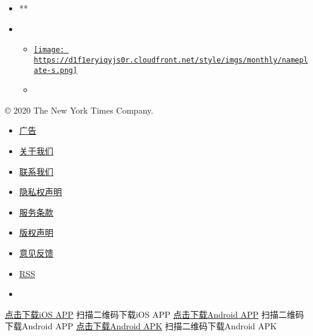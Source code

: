 \begin{itemize}
\item
  **
\item
  \begin{itemize}
  \item
    \href{https://www.shi-magazine.com/}{\texttt{[image: https://d1f1eryiqyjs0r.cloudfront.net/style/imgs/monthly/nameplate-s.png]}}
  \item
  \end{itemize}
\end{itemize}

© 2020 The New York Times Company.

\begin{itemize}
\item
  \href{/help/ad/}{广告}
\item
  \href{/help/about-us/}{关于我们}
\item
  \href{/help/contact/}{联系我们}
\item
  \href{https://help.nytimes3xbfgragh.onion/hc/en-us/articles/115014892108-Privacy-policy}{隐私权声明}
\item
  \href{/help/tos/}{服务条款}
\item
  \href{/help/copyright-statement/}{版权声明}
\item
  \href{mailto:cn.help@NYTimes.com?subject=FEEDBACK}{意见反馈}
\item
  \href{/rss/}{RSS}
\item
\end{itemize}

\href{https://itunes.apple.com/app/apple-store/id807498298?pt=13036\&ct=news-hp\&mt=8}{点击下载iOS
APP} 扫描二维码下载iOS APP
\href{https://play.google.com/store/apps/details?id=com.nytimes.cn}{点击下载Android
APP} 扫描二维码下载Android APP
\href{https://nytcnapps.oss-cn-hongkong.aliyuncs.com/latest.apk}{点击下载Android
APK} 扫描二维码下载Android APK 
